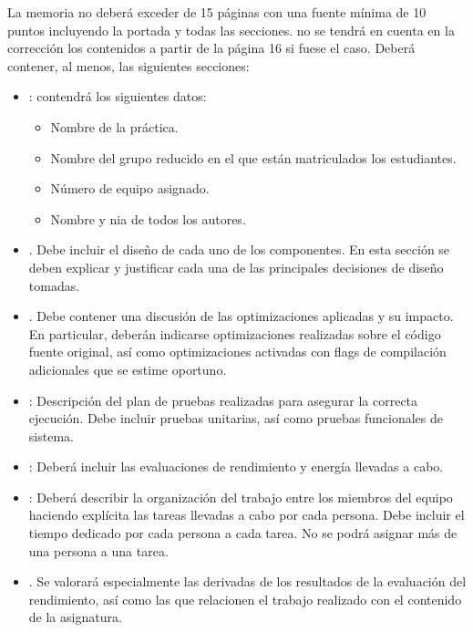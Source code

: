 La memoria no deberá exceder de 15 páginas con una fuente mínima de 10 puntos
incluyendo la portada y todas las secciones.  no se tendrá en cuenta en la
corrección los contenidos a partir de la página 16 si fuese el caso. Deberá
contener, al menos, las siguientes secciones: 

\begin{itemize}

\item {}: contendrá los siguientes datos:
  \begin{itemize}
    \item Nombre de la práctica.
    \item Nombre del grupo reducido en el que están matriculados los estudiantes.
    \item Número de equipo asignado.
    \item Nombre y nia de todos los autores.
  \end{itemize}

\item {}. 
      Debe incluir el diseño de cada uno de los componentes.
      En esta sección se deben explicar y justificar cada una de las principales 
      decisiones de diseño tomadas.

\item {}.
      Debe contener una discusión de las optimizaciones
      aplicadas y su impacto. En particular, deberán indicarse optimizaciones
      realizadas sobre el código fuente original, así como optimizaciones
      activadas con flags de compilación adicionales que se estime oportuno.

\item {}: 
      Descripción del plan de pruebas realizadas para asegurar la correcta ejecución.
      Debe incluir pruebas unitarias, así como pruebas funcionales de sistema.

\item {}: 
      Deberá incluir las evaluaciones de rendimiento y energía llevadas a cabo.

\item {}:
      Deberá describir la organización del trabajo entre los miembros del equipo
      haciendo explícita las tareas llevadas a cabo por cada persona.
      Debe incluir el tiempo dedicado por cada persona a cada tarea.
      No se podrá asignar más de una persona a una tarea.

\item {}.
      Se valorará especialmente las derivadas de los resultados de la evaluación
      del rendimiento, así como las que relacionen el trabajo realizado con el contenido
      de la asignatura.

\end{itemize}
